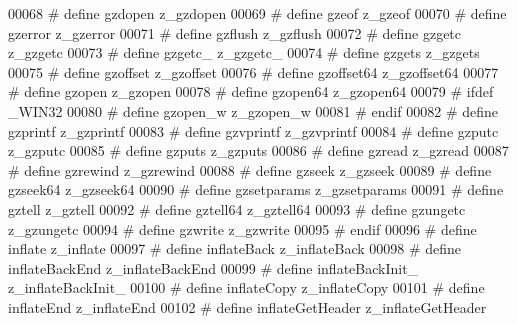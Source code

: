 \begin{DoxyCode}
00068 \textcolor{preprocessor}{#    define gzdopen               z\_gzdopen}
00069 \textcolor{preprocessor}{#    define gzeof                 z\_gzeof}
00070 \textcolor{preprocessor}{#    define gzerror               z\_gzerror}
00071 \textcolor{preprocessor}{#    define gzflush               z\_gzflush}
00072 \textcolor{preprocessor}{#    define gzgetc                z\_gzgetc}
00073 \textcolor{preprocessor}{#    define gzgetc\_               z\_gzgetc\_}
00074 \textcolor{preprocessor}{#    define gzgets                z\_gzgets}
00075 \textcolor{preprocessor}{#    define gzoffset              z\_gzoffset}
00076 \textcolor{preprocessor}{#    define gzoffset64            z\_gzoffset64}
00077 \textcolor{preprocessor}{#    define gzopen                z\_gzopen}
00078 \textcolor{preprocessor}{#    define gzopen64              z\_gzopen64}
00079 \textcolor{preprocessor}{#    ifdef \_WIN32}
00080 \textcolor{preprocessor}{#      define gzopen\_w              z\_gzopen\_w}
00081 \textcolor{preprocessor}{#    endif}
00082 \textcolor{preprocessor}{#    define gzprintf              z\_gzprintf}
00083 \textcolor{preprocessor}{#    define gzvprintf             z\_gzvprintf}
00084 \textcolor{preprocessor}{#    define gzputc                z\_gzputc}
00085 \textcolor{preprocessor}{#    define gzputs                z\_gzputs}
00086 \textcolor{preprocessor}{#    define gzread                z\_gzread}
00087 \textcolor{preprocessor}{#    define gzrewind              z\_gzrewind}
00088 \textcolor{preprocessor}{#    define gzseek                z\_gzseek}
00089 \textcolor{preprocessor}{#    define gzseek64              z\_gzseek64}
00090 \textcolor{preprocessor}{#    define gzsetparams           z\_gzsetparams}
00091 \textcolor{preprocessor}{#    define gztell                z\_gztell}
00092 \textcolor{preprocessor}{#    define gztell64              z\_gztell64}
00093 \textcolor{preprocessor}{#    define gzungetc              z\_gzungetc}
00094 \textcolor{preprocessor}{#    define gzwrite               z\_gzwrite}
00095 \textcolor{preprocessor}{#  endif}
00096 \textcolor{preprocessor}{#  define inflate               z\_inflate}
00097 \textcolor{preprocessor}{#  define inflateBack           z\_inflateBack}
00098 \textcolor{preprocessor}{#  define inflateBackEnd        z\_inflateBackEnd}
00099 \textcolor{preprocessor}{#  define inflateBackInit\_      z\_inflateBackInit\_}
00100 \textcolor{preprocessor}{#  define inflateCopy           z\_inflateCopy}
00101 \textcolor{preprocessor}{#  define inflateEnd            z\_inflateEnd}
00102 \textcolor{preprocessor}{#  define inflateGetHeader      z\_inflateGetHeader}

\end{DoxyCode}
